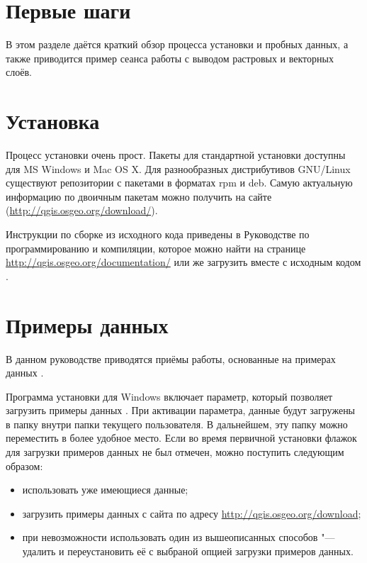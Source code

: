 
\section{Первые шаги}\label{label_getstarted}


В этом разделе даётся краткий обзор процесса установки \qg и пробных
данных, а также приводится пример сеанса работы с выводом растровых и векторных
слоёв.

\section{Установка}\label{label_installation}

Процесс установки \qg очень прост. Пакеты для стандартной установки
доступны для MS Windows и Mac OS X. Для разнообразных дистрибутивов
GNU/Linux существуют репозитории с пакетами в форматах rpm и deb. Самую
актуальную информацию по двоичным пакетам можно получить на сайте
\qg (\url{http://qgis.osgeo.org/download/}).


Инструкции по сборке \qg из исходного кода приведены в Руководстве
по программированию и компиляции, которое можно найти на странице
\url{http://qgis.osgeo.org/documentation/} или же загрузить вместе
с исходным кодом \qg.

\section{Примеры данных}\label{label_sampledata}

В данном руководстве приводятся приёмы работы, основанные на примерах данных
\qg.

\win Программа установки для Windows включает параметр, который позволяет
загрузить примеры данных \qg. При активации параметра, данные будут загружены в папку
 внутри папки 
текущего пользователя. В дальнейшем, эту папку можно переместить в более
удобное место. Если во время первичной установки \qg флажок для загрузки
примеров данных не был отмечен, можно поступить следующим образом:
\begin{itemize}[label=--]
\item использовать уже имеющиеся данные;
\item загрузить примеры данных с сайта \qg по адресу \url{http://qgis.osgeo.org/download};
\item при невозможности использовать один из вышеописанных способов "--- удалить \qg и переустановить её с выбраной опцией загрузки примеров данных.
\end{itemize}


